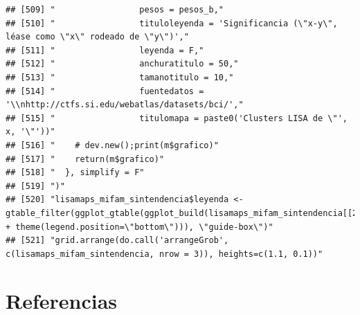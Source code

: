 \documentclass[11pt,]{article}
\begin{document}
\begin{verbatim}
## [509] "                 pesos = pesos_b,"                                                                                                                                     
## [510] "                 tituloleyenda = 'Significancia (\"x-y\", léase como \"x\" rodeado de \"y\")',"                                                                        
## [511] "                 leyenda = F,"                                                                                                                                         
## [512] "                 anchuratitulo = 50,"                                                                                                                                  
## [513] "                 tamanotitulo = 10,"                                                                                                                                   
## [514] "                 fuentedatos = '\\nhttp://ctfs.si.edu/webatlas/datasets/bci/',"                                                                                        
## [515] "                 titulomapa = paste0('Clusters LISA de \"', x, '\"'))"                                                                                                 
## [516] "    # dev.new();print(m$grafico)"                                                                                                                                      
## [517] "    return(m$grafico)"                                                                                                                                                 
## [518] "  }, simplify = F"                                                                                                                                                     
## [519] ")"                                                                                                                                                                     
## [520] "lisamaps_mifam_sintendencia$leyenda <- gtable_filter(ggplot_gtable(ggplot_build(lisamaps_mifam_sintendencia[[2]] + theme(legend.position=\"bottom\"))), \"guide-box\")"
## [521] "grid.arrange(do.call('arrangeGrob', c(lisamaps_mifam_sintendencia, nrow = 3)), heights=c(1.1, 0.1))"
\end{verbatim}

\section*{Referencias}\label{referencias}
\end{document}

